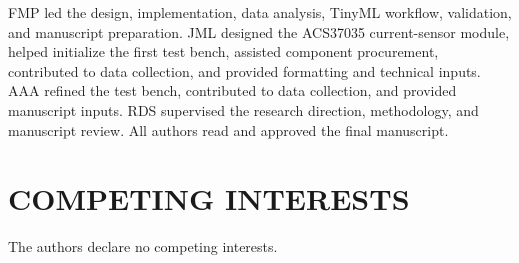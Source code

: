 \documentclass[twocolumn,twoside]{base/ajstd}
\begin{document}
FMP led the design, implementation, data analysis, TinyML workflow, validation, and manuscript preparation. JML designed the ACS37035 current-sensor module, helped initialize the first test bench, assisted component procurement, contributed to data collection, and provided formatting and technical inputs. AAA refined the test bench, contributed to data collection, and provided manuscript inputs. RDS supervised the research direction, methodology, and manuscript review. All authors read and approved the final manuscript.

\section*{COMPETING INTERESTS}

The authors declare no competing interests.

\nolinenumbers


\atColsEnd{\vfill}
\end{document}
